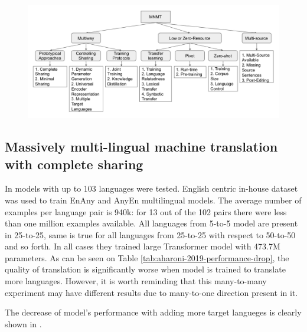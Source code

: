 \begin{figure}[h]
	\begin{minipage}{0.9\textwidth}
	\centering
	\includegraphics[width=1.0\columnwidth]{../img/dabre_2019_mnmt_categorized.png}
	\end{minipage}\hfill
	\label{fig:mnmt_categorized}
\end{figure}


\subsection{Massively multi-lingual machine translation with complete sharing}
\label{section:multitarget_theory}

In \cite{aharoni-etal-2019-massively} models with up to 103 languages were tested.
English centric in-house dataset was used to train En\to{}Any and Any\to{}En multilingual models.
The average number of examples per language pair is 940k:
for 13 out of the 102 pairs there were less than one million examples available.
All languages from 5-to-5 model are present in 25-to-25, same is true for all languages from 25-to-25 with respect to 50-to-50 and so forth.
In all cases they trained large Transformer model with 473.7M parameters.
As can be seen on Table \ref{tab:aharoni-2019-performance-drop}, the quality of translation
is significantly worse when model is trained to translate more languages.
However, it is worth reminding that this many-to-many experiment may have different results due to many-to-one direction present in it.

The decrease of model's performance with adding more target langueges
is clearly shown in \cite{aharoni-etal-2019-massively}.


